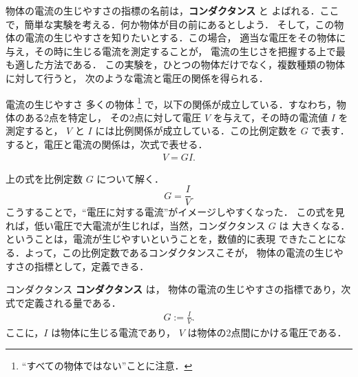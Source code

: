         物体の電流の生じやすさの指標の名前は，\textbf{コンダクタンス} と
        よばれる．ここで，簡単な実験を考える．何か物体が目の前にあるとしよう．
        そして，この物体の電流の生じやすさを知りたいとする．この場合，
        適当な電圧をその物体に与え，その時に生じる電流を測定することが，
        電流の生じさを把握する上で最も適した方法である．
        この実験を，ひとつの物体だけでなく，複数種類の物体に対して行うと，
        次のような電流と電圧の関係を得られる．\\
            \begin{itembox}[l]{電流の生じやすさ}
                多くの物体
                    \footnote{
                        “すべての物体ではない”ことに注意．
                    }
                で，以下の関係が成立している．すなわち，物体のある2点を特定し，
                その2点に対して電圧 $V$ を与えて，その時の電流値 $I$ を測定すると，
                $V$ と $I$ には比例関係が成立している．この比例定数を $G$ で表す．
                すると，電圧と電流の関係は，次式で表せる．
                    \begin{align}
                        V = GI.
                    \end{align}
            \end{itembox}

            上の式を比例定数 $G$ について解く．
                \begin{equation*}
                    G = \frac{I}{V}.
                \end{equation*}
            こうすることで，“電圧に対する電流”がイメージしやすくなった．
            この式を見れば，低い電圧で大電流が生じれば，当然，コンダクタンス $G$ は
            大きくなる．ということは，電流が生じやすいということを，数値的に表現
            できたことになる．よって，この比例定数であるコンダクタンスこそが，
            物体の電流の生じやすさの指標として，定義できる．
            \begin{myshadebox}{コンダクタンス}
                \textbf{コンダクタンス} は，
                物体の電流の生じやすさの指標であり，次式で定義される量である．
                    \begin{align}
                        G := \frac{I}{V}.
                    \end{align}
                ここに，$I$ は物体に生じる電流であり，
                $V$ は物体の2点間にかける電圧である．
            \end{myshadebox}

